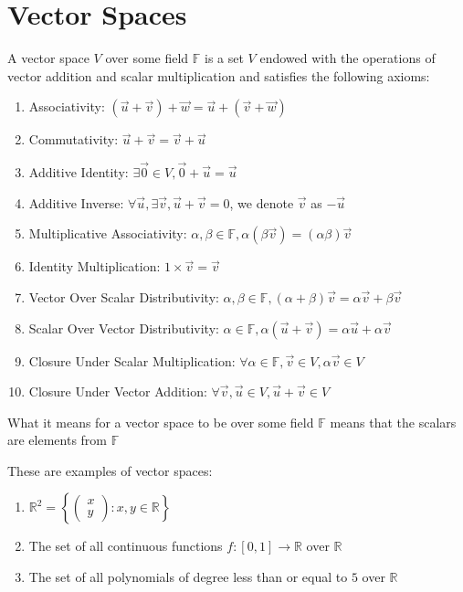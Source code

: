 \section{Vector Spaces}
\begin{definition}
    A vector space $V$ over some field $\mathbb{F}$ is a set $V$ endowed with the operations of vector addition and scalar multiplication and satisfies the following axioms:
    \begin{enumerate}
        \item Associativity: $(\vec{u}+\vec{v})+\vec{w}=\vec{u}+(\vec{v}+\vec{w})$
        \item Commutativity: $\vec{u}+\vec{v}=\vec{v}+\vec{u}$
        \item Additive Identity: $\exists\vec{0}\in V, \vec{0}+\vec{u}=\vec{u}$
        \item Additive Inverse:
        $\forall\vec{u},\exists\vec{v},\vec{u}+\vec{v}=0$, we denote $\vec{v}$ as $-\vec{u}$
        \item Multiplicative Associativity: $\alpha,\beta\in\mathbb{F}, \alpha(\beta\vec{v})=(\alpha\beta)\vec{v}$
        \item Identity Multiplication: $1\times\vec{v}=\vec{v}$
        \item Vector Over Scalar Distributivity: $\alpha,\beta\in\mathbb{F},(\alpha+\beta)\vec{v}=\alpha\vec{v}+\beta\vec{v}$
        \item Scalar Over Vector Distributivity:
        $\alpha\in\mathbb{F},\alpha(\vec{u}+\vec{v})=\alpha\vec{u}+\alpha\vec{v}$
        \item Closure Under Scalar Multiplication:
        $\forall\alpha\in\mathbb{F},\vec{v}\in V, \alpha\vec{v}\in V$
        \item Closure Under Vector Addition: $\forall\vec{v},\vec{u}\in V, \vec{u}+\vec{v}\in V$
    \end{enumerate}
\end{definition}
\begin{remark}
    What it means for a vector space to be over some field $\mathbb{F}$ means that the scalars are elements from $\mathbb{F}$
\end{remark}
\begin{example}
    These are examples of vector spaces:
    \begin{enumerate}
        \item $\mathbb{R}^2=\left\{\begin{pmatrix}
            x \\ y
        \end{pmatrix}: x,y\in\mathbb{R}\right\}$
        \item The set of all continuous functions $f:[0,1]\to\mathbb{R}$ over $\mathbb{R}$
        \item The set of all polynomials of degree less than or equal to $5$ over $\mathbb{R}$
    \end{enumerate}
\end{example}

